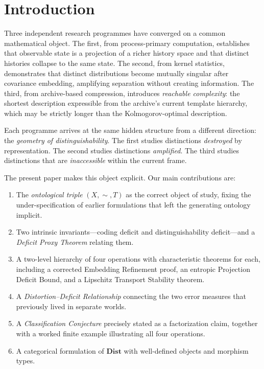 \documentclass[12pt, a4paper]{article}
\theoremstyle{plain}
\theoremstyle{definition}
\theoremstyle{remark}
\begin{document}
\tableofcontents
\newpage

\section{Introduction}
\label{sec:intro}

Three independent research programmes have converged on a common mathematical
object. The first, from process-primary computation, establishes that observable
state is a projection of a richer history space and that distinct histories
collapse to the same state. The second, from kernel statistics, demonstrates
that distinct distributions become mutually singular after covariance embedding,
amplifying separation without creating information. The third, from archive-based
compression, introduces \emph{reachable complexity}: the shortest description
expressible from the archive's current template hierarchy, which may be strictly
longer than the Kolmogorov-optimal description.

Each programme arrives at the same hidden structure from a different direction:
the \emph{geometry of distinguishability}. The first studies distinctions
\emph{destroyed} by representation. The second studies distinctions
\emph{amplified}. The third studies distinctions that are \emph{inaccessible}
within the current frame.

The present paper makes this object explicit. Our main contributions are:

\begin{enumerate}[leftmargin=1.8em, label=(\arabic*)]
  \item The \emph{ontological triple} $(X,\sim,T)$ as the correct object of
        study, fixing the under-specification of earlier formulations that left
        the generating ontology implicit.
  \item Two intrinsic invariants---coding deficit and distinguishability
        deficit---and a \emph{Deficit Proxy Theorem} relating them.
  \item A two-level hierarchy of four operations with characteristic theorems
        for each, including a corrected Embedding Refinement proof, an entropic
        Projection Deficit Bound, and a Lipschitz Transport Stability theorem.
  \item A \emph{Distortion--Deficit Relationship} connecting the two error
        measures that previously lived in separate worlds.
  \item A \emph{Classification Conjecture} precisely stated as a factorization
        claim, together with a worked finite example illustrating all four
        operations.
  \item A categorical formulation of $\mathbf{Dist}$ with well-defined objects
        and morphism types.
\end{enumerate}
\end{document}
